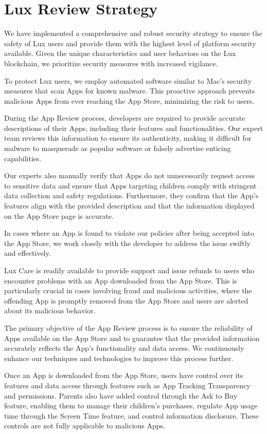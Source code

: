 \documentclass[11pt]{article}
\begin{document}
\section{Lux Review Strategy}

We have implemented a comprehensive and robust security strategy to ensure the safety of Lux users and provide them with the highest level of platform security available. Given the unique characteristics and user behaviors on the Lux blockchain, we prioritize security measures with increased vigilance.


To protect Lux users, we employ automated software similar to Mac's security measures that scan Apps for known malware. This proactive approach prevents malicious Apps from ever reaching the App Store, minimizing the risk to users.


During the App Review process, developers are required to provide accurate descriptions of their Apps, including their features and functionalities. Our expert team reviews this information to ensure its authenticity, making it difficult for malware to masquerade as popular software or falsely advertise enticing capabilities.


Our experts also manually verify that Apps do not unnecessarily request access to sensitive data and ensure that Apps targeting children comply with stringent data collection and safety regulations. Furthermore, they confirm that the App's features align with the provided description and that the information displayed on the App Store page is accurate.


In cases where an App is found to violate our policies after being accepted into the App Store, we work closely with the developer to address the issue swiftly and effectively.


Lux Care is readily available to provide support and issue refunds to users who encounter problems with an App downloaded from the App Store. This is particularly crucial in cases involving fraud and malicious activities, where the offending App is promptly removed from the App Store and users are alerted about its malicious behavior.


The primary objective of the App Review process is to ensure the reliability of Apps available on the App Store and to guarantee that the provided information accurately reflects the App's functionality and data access. We continuously enhance our techniques and technologies to improve this process further.


Once an App is downloaded from the App Store, users have control over its features and data access through features such as App Tracking Transparency and permissions. Parents also have added control through the Ask to Buy feature, enabling them to manage their children's purchases, regulate App usage time through the Screen Time feature, and control information disclosure. These controls are not fully applicable to malicious Apps.
\end{document}
